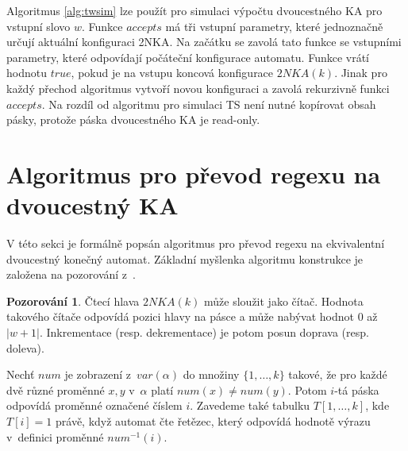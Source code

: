 \documentclass[thesis=B,czech]{FITthesis}[2019/12/23]
\theoremstyle{definition}
\newtheorem{pozorovani}{Pozorování}[chapter]
\begin{document}
Algoritmus \ref{alg:twsim} lze použít pro simulaci výpočtu dvoucestného KA pro vstupní slovo $w$. Funkce $accepts$ má tři vstupní parametry, které jednoznačně určují aktuální konfiguraci 2NKA. Na začátku se zavolá tato funkce se vstupními parametry, které odpovídají počáteční konfigurace automatu. Funkce vrátí hodnotu $true$, pokud je na vstupu koncová konfigurace $2NKA(k)$. Jinak pro každý přechod algoritmus vytvoří novou konfiguraci a zavolá rekurzivně funkci $accepts$. Na rozdíl od algoritmu pro simulaci TS není nutné kopírovat obsah pásky, protože páska dvoucestného KA je read-only.

\fi

\iffalse
\section{Algoritmus pro převod regexu na dvoucestný KA}

V této sekci je formálně popsán algoritmus pro převod regexu na ekvivalentní dvoucestný konečný automat. Základní myšlenka algoritmu konstrukce je založena na pozorování z~\cite[s. 21--22]{schmidthesis}.
\begin{pozorovani} Čtecí hlava $2NKA(k)$ může sloužit jako čítač. Hodnota takového čítače odpovídá pozici hlavy na pásce a může nabývat hodnot $0$ až $|w+1|$. Inkrementace (resp. dekrementace) je potom posun doprava (resp. doleva). 
\end{pozorovani}

Nechť $num$ je zobrazení z~$var(\alpha)$ do množiny $\{1, \dots, k\}$ takové, že pro každé dvě různé proměnné $x, y$ v~$\alpha$ platí $num(x) \ne num(y)$. Potom $i$-tá páska odpovídá proměnné označené číslem $i$. Zavedeme také tabulku $T[1, \dots, k]$, kde $T[i] = 1$ právě, když automat čte řetězec, který odpovídá hodnotě výrazu v~definici proměnné $num^{-1}(i)$. 
\end{document}
